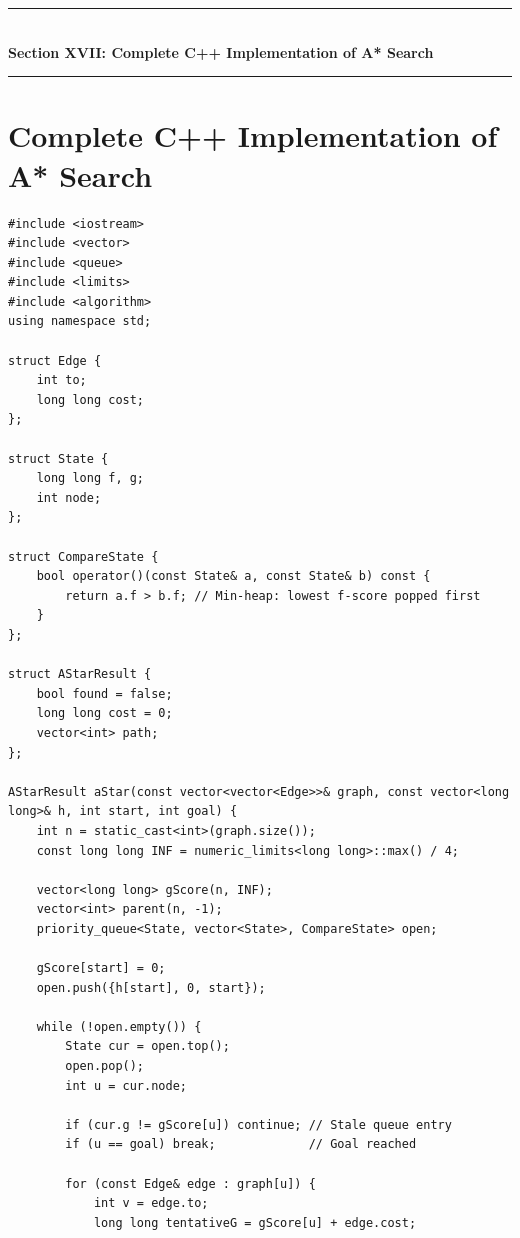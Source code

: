 \newpage
\begin{center}
\vspace{0.5em}
{\color{primary}\rule{0.45\textwidth}{1.2pt}}\\[4pt]
{\Large\bfseries\color{primary} Section XVII: Complete C++ Implementation of A* Search}\\[2pt]
{\color{primary}\rule{0.45\textwidth}{1.2pt}}
\vspace{0.5em}
\end{center}

\section{Complete C++ Implementation of A* Search}

\begin{lstlisting}[style=cppstyle, caption={C++ A* Search Algorithm on Weighted Graph.}]
#include <iostream>
#include <vector>
#include <queue>
#include <limits>
#include <algorithm>
using namespace std;

struct Edge {
    int to;
    long long cost;
};

struct State {
    long long f, g;
    int node;
};

struct CompareState {
    bool operator()(const State& a, const State& b) const {
        return a.f > b.f; // Min-heap: lowest f-score popped first
    }
};

struct AStarResult {
    bool found = false;
    long long cost = 0;
    vector<int> path;
};

AStarResult aStar(const vector<vector<Edge>>& graph, const vector<long long>& h, int start, int goal) {
    int n = static_cast<int>(graph.size());
    const long long INF = numeric_limits<long long>::max() / 4;

    vector<long long> gScore(n, INF);
    vector<int> parent(n, -1);
    priority_queue<State, vector<State>, CompareState> open;

    gScore[start] = 0;
    open.push({h[start], 0, start});

    while (!open.empty()) {
        State cur = open.top();
        open.pop();
        int u = cur.node;

        if (cur.g != gScore[u]) continue; // Stale queue entry
        if (u == goal) break;             // Goal reached

        for (const Edge& edge : graph[u]) {
            int v = edge.to;
            long long tentativeG = gScore[u] + edge.cost;


\end{lstlisting}
